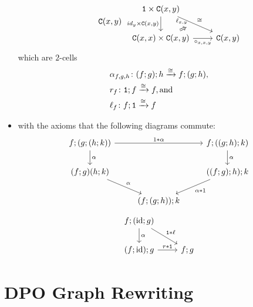 \documentclass[10pt,a4paper]{article}
\newcommand{\cat}[1]{\mathtt{#1}}
\renewcommand{\t}[1]{\textup{#1}}
\newcommand{\from}{\colon}
\newcommand{\xto}[1]{\xrightarrow{#1}}
\renewcommand{\(}{\left(}
\renewcommand{\)}{\right)}
\renewcommand{\{}{\left\lbrace}
\renewcommand{\}}{\right\rbrace}
\theoremstyle{remark}
\theoremstyle{definition}
\begin{document}
\begin{itemize}
\[\begin{tikzcd}
			&
		\cat{C} (x,y)
	\end{tikzcd}
	\begin{tikzcd}
		\cat{1} \times \cat{C}(x,y)
			\arrow[]{rd}{\cong}
			\arrow[swap]{d}{id_y \times \cat{C}(x,y)}
			&
		{}
			\\
		\cat{C}(x,x) \times \cat{C}(x,y)
			\arrow[swap]{r}{\circ_{x,x,y}}
			\arrow[Rightarrow, shorten <=3pt, shorten >=50pt]{ur}[near start]{\ell_{x,y}}
			&
		\cat{C} (x,y)
	\end{tikzcd}
\]
which are $2$-cells 
\begin{align*}
	& \alpha_{f,g,h} \from (f;g);h \xto{\cong} f;(g;h), \\ 
	& r_f \from \cat{1} ; f \xto{\cong} f, \t{and} \\
	& \ell_f \from f ; \cat{1} \xto{\cong} f
\end{align*}
	\item with the axioms that the following diagrams commute:
\[
	\begin{tikzcd}
		f;(g;(h;k)) 
			\arrow[]{rr}{1 \ast \alpha}
			\arrow[]{d}{\alpha}
			&
		{} 
			&
		f;((g;h);k) 
			\arrow[]{d}{\alpha}
			\\
		(f;g)(h;k) 
			\arrow[]{dr}{\alpha}
			&
		{} 
			&
		((f;g);h);k
			\arrow[]{dl}{\alpha \ast 1}
			\\
		{}
			&
		(f;(g;h));k
			&
		{}
	\end{tikzcd}
\]
\[
	\begin{tikzcd}
		f;(\t{id};g)
			\arrow[]{d}{\alpha}
			\arrow[]{dr}{\cat{1} \ast \ell}
			&
		{}
			\\
		(f;\t{id});g
			\arrow[]{r}{r \ast \cat{1}}
			&
		f;g		
	\end{tikzcd}
\]
\end{itemize}	


\section*{DPO Graph Rewriting}
\end{document}
